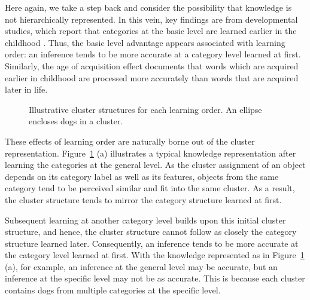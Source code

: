 \documentclass[doc]{apa6}
\begin{document}
Here again, we take a step back and consider the possibility that knowledge is not hierarchically
represented. In this vein, key findings are from developmental studies, which report that categories
at the basic level are learned earlier in the childhood \parencite{Berlin1973a, Brown1958a,
Horton1980a, Mervis1982a}.  Thus, the basic level advantage appears associated with learning order:
an inference tends to be more accurate at a category level learned at first.  Similarly, the age of
acquisition effect documents that words which are acquired earlier in childhood are processed more
accurately than words that are acquired later in life.

\begin{figure}
    \centering



    \vspace{10pt}

    \caption{Illustrative cluster structures for each learning order. An ellipse encloses dogs in a
    cluster.}

\label{fig:learning_order}
\end{figure}

These effects of learning order are naturally borne out of the cluster representation.
Figure~\ref{fig:learning_order} (a) illustrates a typical knowledge representation after learning
the categories at the general level. As the cluster assignment of an object depends on its category
label as well as its features, objects from the same category tend to be perceived similar and fit
into the same cluster.  As a result, the cluster structure tends to mirror the category structure
learned at first.

Subsequent learning at another category level builds upon this initial cluster structure, and hence,
the cluster structure cannot follow as closely the category structure learned later.  Consequently,
an inference tends to be more accurate at the category level learned at first.  With the knowledge
represented as in Figure~\ref{fig:learning_order} (a), for example, an inference at the general
level may be accurate, but an inference at the specific level may not be as accurate. This is
because each cluster contains dogs from multiple categories at the specific level.
\end{document}
